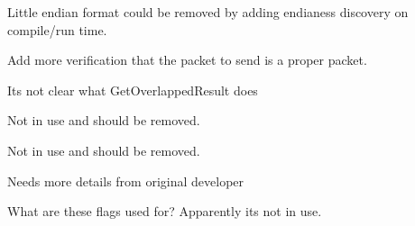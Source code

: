 \begin{DoxyRefList}
\item[\label{todo__todo000018}%
\hypertarget{todo__todo000018}{}%
전역 \hyperlink{class_p_t_p_message_common_acecb3e9987905070c3e9d089bae8e70d}{P\+T\+P\+Message\+Common\+:\+:set\+Correction\+Field} (long long correction\+Amount)]Little endian format could be removed by adding endianess discovery on compile/run time.  
\item[\label{todo__todo000033}%
\hypertarget{todo__todo000033}{}%
전역 \hyperlink{maap__tests_8cpp_a85813c177f5b08a4173307c27a08d312}{verify\+\_\+sent\+\_\+packets} (\hyperlink{struct_maap___client}{Maap\+\_\+\+Client} $\ast$p\+\_\+mc, \hyperlink{struct_maap___notify}{Maap\+\_\+\+Notify} $\ast$p\+\_\+mn, const void $\ast$$\ast$p\+\_\+sender\+\_\+out, int $\ast$p\+\_\+probe\+\_\+packets\+\_\+detected, int $\ast$p\+\_\+announce\+\_\+packets\+\_\+detected, int send\+\_\+probe, int send\+\_\+announce, int send\+\_\+defend, uint64\+\_\+t remote\+\_\+addr, int stop\+\_\+after\+\_\+probe)]Add more verification that the packet to send is a proper packet.  
\item[\label{todo__todo000029}%
\hypertarget{todo__todo000029}{}%
전역 \hyperlink{class_windows_n_pipe_message_ad65e923c3adebfc9ff97d89007bf5633}{Windows\+N\+Pipe\+Message\+:\+:read\+\_\+ol\+\_\+complete} (H\+A\+N\+D\+LE pipe)]Its not clear what Get\+Overlapped\+Result does  
\item[\label{todo__todo000027}%
\hypertarget{todo__todo000027}{}%
클래스 \hyperlink{union_windows_n_pipe_msg_client}{Windows\+N\+Pipe\+Msg\+Client} ]Not in use and should be removed.  
\item[\label{todo__todo000028}%
\hypertarget{todo__todo000028}{}%
클래스 \hyperlink{union_windows_n_pipe_msg_server}{Windows\+N\+Pipe\+Msg\+Server} ]Not in use and should be removed.  
\item[\label{todo__todo000026}%
\hypertarget{todo__todo000026}{}%
클래스 \hyperlink{struct_windows_timer_queue_handler_arg}{Windows\+Timer\+Queue\+Handler\+Arg} ]Needs more details from original developer  
\item[\label{todo__todo000030}%
\hypertarget{todo__todo000030}{}%
전역 \hyperlink{class_win_n_pipe_ctrl_message_a83bc6e7548a8b01aa00128d592d6b987}{Win\+N\+Pipe\+Ctrl\+Message\+:\+:get\+Flags} ()]What are these flags used for? Apparently its not in use. 
\end{DoxyRefList}